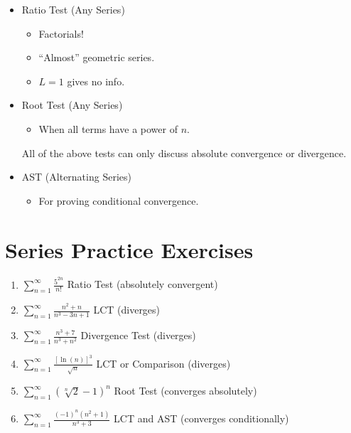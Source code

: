 \begin{itemize}
    \item Ratio Test (Any Series)
          \begin{itemize}
              \item Factorials!
              \item ``Almost'' geometric series.
              \item $ L=1 $ gives no info.
          \end{itemize}
    \item Root Test (Any Series)
          \begin{itemize}
              \item When all terms have a power of $ n $.
          \end{itemize}
          All of the above tests can only discuss absolute convergence or divergence.
    \item AST (Alternating Series)
          \begin{itemize}
              \item For proving conditional convergence.
          \end{itemize}
\end{itemize}

\section*{Series Practice Exercises}
\begin{Example}{}{}
    \begin{enumerate}
        \item $ \displaystyle \sum\limits_{n=1}^{\infty}\frac{5^{2n}}{n!} $ Ratio Test
              (absolutely convergent)
        \item $ \displaystyle \sum\limits_{n=1}^{\infty} \frac{n^2+n}{n^3-3n+1} $ LCT
              (diverges)
        \item $ \displaystyle \sum\limits_{n=1}^{\infty} \frac{n^3+7}{n^3+n^2} $
              Divergence Test (diverges)
        \item $ \displaystyle \sum\limits_{n=1}^{\infty} \frac{\left[ \ln(n) \right]^3}{\sqrt{n}} $
              LCT or Comparison (diverges)
        \item $ \displaystyle \sum\limits_{n=1}^{\infty} (\sqrt[n]{2}-1)^n $ Root Test
              (converges absolutely)
        \item $ \displaystyle \sum\limits_{n=1}^{\infty} \frac{(-1)^n(n^2+1)}{n^3+3} $
              LCT and AST (converges conditionally)
    \end{enumerate}
\end{Example}
